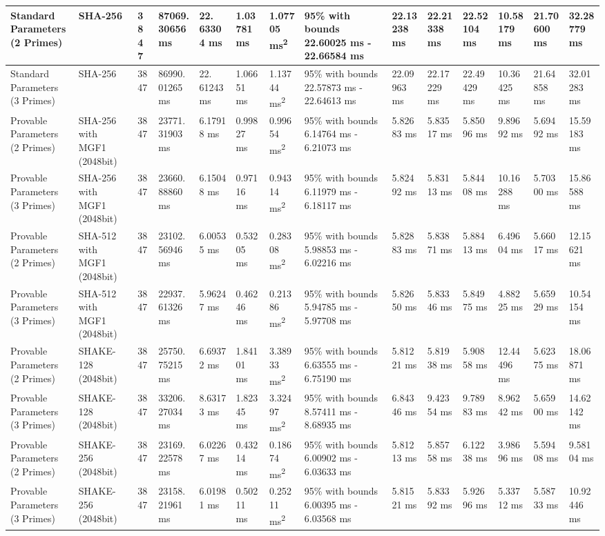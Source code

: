 \documentclass[]{final_report}
\theoremstyle{definition}
\begin{document}
\begin{landscape}
\begin{longtable}{|p{2.3cm}|p{1.8cm}|p{1.0cm}|p{1.7cm}|p{1.4cm}|p{1.5cm}|p{1.8cm}|p{1.5cm}|p{1.43cm}|p{1.5cm}|p{1.3cm}|p{1.4cm}|p{1.3cm}|p{1.3cm}|}
\hline
\endlastfoot
Standard Parameters (2 Primes) & SHA-256 & 3847 & 87069.30656 ms & 22.
63304 ms & 1.03781 ms & 1.07705 ms\textsuperscript{2} & 95\% with bounds 22.60025 ms - 22.66584 ms & 22.13238 ms & 22.21338 ms & 22.52104 ms & 10.58179 ms & 21.70600 ms & 32.28779 ms \\
\hline
Standard Parameters (3 Primes) & SHA-256 & 3847 & 86990.01265 ms & 22.
61243 ms & 1.06651 ms & 1.13744 ms\textsuperscript{2} & 95\% with bounds 22.57873 ms - 22.64613 ms & 22.09963 ms & 22.17229 ms & 22.49429 ms & 10.36425 ms & 21.64858 ms & 32.01283 ms \\
\hline
Provable Parameters (2 Primes) & SHA-256 with MGF1 (2048bit) & 3847 & 23771.
31903 ms & 6.17918 ms & 0.99827 ms & 0.99654 ms\textsuperscript{2} & 95\% with bounds 6.14764 ms - 6.21073 ms & 5.82683 ms & 5.83517 ms & 5.85096 ms & 9.89692 ms & 5.69492 ms & 15.59183 ms \\
\hline
Provable Parameters (3 Primes) & SHA-256 with MGF1 (2048bit) & 3847 & 23660.
88860 ms & 6.15048 ms & 0.97116 ms & 0.94314 ms\textsuperscript{2} & 95\% with bounds 6.11979 ms - 6.18117 ms & 5.82492 ms & 5.83113 ms & 5.84408 ms & 10.16288 ms & 5.70300 ms & 15.86588 ms \\
\hline
Provable Parameters (2 Primes) & SHA-512 with MGF1 (2048bit) & 3847 & 23102.
56946 ms & 6.00535 ms & 0.53205 ms & 0.28308 ms\textsuperscript{2} & 95\% with bounds 5.98853 ms - 6.02216 ms & 5.82883 ms & 5.83871 ms & 5.88413 ms & 6.49604 ms & 5.66017 ms & 12.15621 ms \\
\hline
Provable Parameters (3 Primes) & SHA-512 with MGF1 (2048bit) & 3847 & 22937.
61326 ms & 5.96247 ms & 0.46246 ms & 0.21386 ms\textsuperscript{2} & 95\% with bounds 5.94785 ms - 5.97708 ms & 5.82650 ms & 5.83346 ms & 5.84975 ms & 4.88225 ms & 5.65929 ms & 10.54154 ms \\
\hline
Provable Parameters (2 Primes) & SHAKE-128 (2048bit) & 3847 & 25750.
75215 ms & 6.69372 ms & 1.84101 ms & 3.38933 ms\textsuperscript{2} & 95\% with bounds 6.63555 ms - 6.75190 ms & 5.81221 ms & 5.81938 ms & 5.90858 ms & 12.44496 ms & 5.62375 ms & 18.06871 ms \\
\hline
Provable Parameters (3 Primes) & SHAKE-128 (2048bit) & 3847 & 33206.
27034 ms & 8.63173 ms & 1.82345 ms & 3.32497 ms\textsuperscript{2} & 95\% with bounds 8.57411 ms - 8.68935 ms & 6.84346 ms & 9.42354 ms & 9.78983 ms & 8.96242 ms & 5.65900 ms & 14.62142 ms \\
\hline
Provable Parameters (2 Primes) & SHAKE-256 (2048bit) & 3847 & 23169.
22578 ms & 6.02267 ms & 0.43214 ms & 0.18674 ms\textsuperscript{2} & 95\% with bounds 6.00902 ms - 6.03633 ms & 5.81213 ms & 5.85758 ms & 6.12238 ms & 3.98696 ms & 5.59408 ms & 9.58104 ms \\
\hline
Provable Parameters (3 Primes) & SHAKE-256 (2048bit) & 3847 & 23158.
21961 ms & 6.01981 ms & 0.50211 ms & 0.25211 ms\textsuperscript{2} & 95\% with bounds 6.00395 ms - 6.03568 ms & 5.81521 ms & 5.83392 ms & 5.92696 ms & 5.33712 ms & 5.58733 ms & 10.92446 ms \\
\hline


\end{longtable}
\end{landscape}
\end{document}
